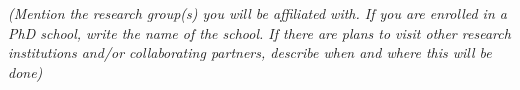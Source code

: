 %
%
\textit{(Mention the research group(s) you will be affiliated with. If you are enrolled in a PhD school, write the name of the school. If there are plans to visit other research institutions and/or collaborating partners, describe when and where this will be done)}